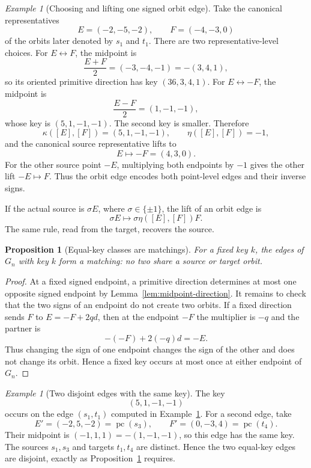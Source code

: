 \documentclass[11pt]{amsart}
\newtheorem{proposition}[theorem]{Proposition}
\theoremstyle{definition}
\theoremstyle{remark}
\newtheorem{example}[theorem]{Example}
\newcommand{\pc}{\operatorname{pc}}
\begin{document}
\begin{example}[Choosing and lifting one signed orbit edge]
\label{ex:signed-orbit-41}
Take the canonical representatives
\[
 E=(-2,-5,-2),
 \qquad
 F=(-4,-3,0)
\]
of the orbits later denoted by $s_1$ and $t_1$.  There are two
representative-level choices.  For $E\leftrightarrow F$, the midpoint is
\[
 \frac{E+F}{2}=(-3,-4,-1)=-(3,4,1),
\]
so its oriented primitive direction has key $(36,3,4,1)$.  For
$E\leftrightarrow -F$, the midpoint is
\[
 \frac{E-F}{2}=(1,-1,-1),
\]
whose key is $(5,1,-1,-1)$.  The second key is smaller.  Therefore
\[
 \kappa([E],[F])=(5,1,-1,-1),
 \qquad
 \eta([E],[F])=-1,
\]
and the canonical source representative lifts to
\[
 E\longmapsto-F=(4,3,0).
\]
For the other source point $-E$, multiplying both endpoints by $-1$ gives the
other lift $-E\mapsto F$.  Thus the orbit edge encodes both point-level edges
and their inverse signs.
\end{example}

If the actual source is $\sigma E$, where $\sigma\in\{\pm1\}$, the lift of an
orbit edge is
\begin{equation}\label{eq:sign-lift}
 \sigma E\longmapsto \sigma\eta([E],[F])F.
\end{equation}
The same rule, read from the target, recovers the source.

\begin{proposition}[Equal-key classes are matchings]
\label{prop:key-class-matching}
For a fixed key $k$, the edges of $G_n$ with key $k$ form a matching: no two
share a source or target orbit.
\end{proposition}

\begin{proof}
At a fixed signed endpoint, a primitive direction determines at most one
opposite signed endpoint by Lemma~\ref{lem:midpoint-direction}.  It remains to
check that the two signs of an endpoint do not create two orbits.  If a fixed
direction sends $F$ to $E=-F+2qd$, then at the endpoint $-F$ the multiplier is
$-q$ and the partner is
\[
 -(-F)+2(-q)d=-E.
\]
Thus changing the sign of one endpoint changes the sign of the other and does
not change its orbit.  Hence a fixed key occurs at most once at either
endpoint of $G_n$.
\end{proof}

\begin{example}[Two disjoint edges with the same key]
\label{ex:equal-key-41}
The key
\[
 (5,1,-1,-1)
\]
occurs on the edge $(s_1,t_1)$ computed in
Example~\ref{ex:signed-orbit-41}.  For a second edge, take
\[
 E'=(-2,5,-2)=\pc(s_3),
 \qquad
 F'=(0,-3,4)=\pc(t_4).
\]
Their midpoint is $(-1,1,1)=-(1,-1,-1)$, so this edge has the same key.
The sources $s_1,s_3$ and targets $t_1,t_4$ are distinct.  Hence the two
equal-key edges are disjoint, exactly as
Proposition~\ref{prop:key-class-matching} requires.
\end{example}
\end{document}
